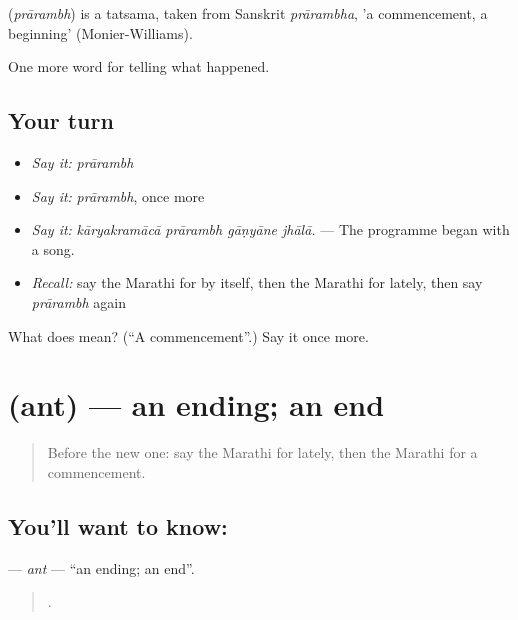 \begin{cousinweb}
\textbf{} (\emph{prārambh}) is a tatsama, taken from Sanskrit \emph{prārambha}, 'a commencement, a beginning' (Monier-Williams).
\end{cousinweb}

\begin{grammarlens}[title={What you've built}]
One more word for telling what happened.
\end{grammarlens}

\subsection*{Your turn}
\begin{itemize}
\raggedright
  \item \emph{Say it:} \emph{prārambh}
  \item \emph{Say it:} \emph{prārambh}, once more
  \item \emph{Say it:} \emph{kāryakramācā prārambh gāṇyāne jhālā.} — The programme began with a song.
  \item \emph{Recall:} say the Marathi for by itself, then the Marathi for lately, then say \emph{prārambh} again
\end{itemize}

\begin{tcolorbox}[breakable,colback=teal!4,colframe=teal!35!black,title={Before you move on}]
What does  mean? (\textquotedblleft{}A commencement\textquotedblright{}.) Say it once more.
\end{tcolorbox}
\section[\texorpdfstring{\mr{अंत} (ant)}{अंत (ant)}]{ (ant) — an ending; an end}

\label{lesson:MR-C307-ant}



\begin{quote}
Before the new one: say the Marathi for lately, then the Marathi for a commencement.
\end{quote}

\subsection*{You'll want to know: }
\textbf{} — \emph{ant} — \textquotedblleft{}an ending; an end\textquotedblright{}.

\begin{quote}
     .
\end{quote}

